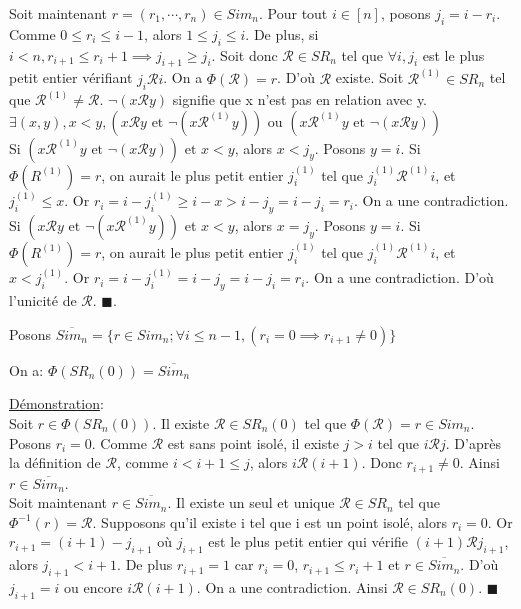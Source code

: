 			Soit maintenant $r=(r_{1},\cdots, r_{n}) \in Sim_{n}$. Pour tout $i\in[n]$, posons $j_{i}=i-r_{i} $.\\
			Comme $0\leq r_{i}\leq i-1 $, alors $1\leq j_{i} \leq i$. De plus, si $i<n,r_{i+1}\leq r_{i}+1 \implies j_{i+1}\geq j_{i} $. Soit donc $\mathcal{R}\in SR_{n}$ tel que $\forall i, j_{i}$ est le plus petit entier vérifiant $j_{i}\mathcal{R}i$. On a $\Phi(\mathcal{R})=r $. D'où $\mathcal{R}$ existe. Soit $\mathcal{R}^{(1)}\in SR_{n}$ tel que $\mathcal{R}^{(1)}\neq \mathcal{R}$. $\neg(x\mathcal{R}y) $ signifie que x n'est pas en relation avec y.\\
			$\exists (x,y), x<y, (x\mathcal{R}y\text{ et } \neg(x\mathcal{R}^{(1)}y) )\text{ ou }
			(x\mathcal{R}^{(1)}y\text{ et } \neg(x\mathcal{R}y) ) $\\
			Si $(x\mathcal{R}^{(1)}y\text{ et } \neg(x\mathcal{R}y)) \text{ et } x<y$, alors $x<j_{y}$. Posons $y=i$. Si $\Phi(R^{(1)})=r $, on aurait le plus petit entier $j^{(1)}_{i}$ tel que $j^{(1)}_{i} \mathcal{R}^{(1)}  i$, et $j^{(1)}_{i}\leq x$. Or $ r_{i}=i- j^{(1)}_{i} \geq i-x > i-j_{y} = i-j_{i}=r_{i}$. On a une contradiction.\\
			Si $(x\mathcal{R}y\text{ et } \neg(x\mathcal{R}^{(1)}y) )$ et $x<y$, alors  $x=j_{y}$. Posons $y=i$. Si $\Phi(R^{(1)})=r $, on aurait le plus petit entier $j^{(1)}_{i}$ tel que $j^{(1)}_{i} \mathcal{R}^{(1)}  i$, et $x<j^{(1)}_{i}$. Or $ r_{i}=i-j^{(1)}_{i}=i-j_{y}=i-j_{i}=r_{i} $. On a une contradiction. D'où l'unicité de $\mathcal{R}$. $\blacksquare$.\newpage

			Posons $\overline{Sim_{n}} = \{ r\in Sim_{n}; \forall i\leq n-1,(r_{i}=0  \implies r_{i+1}\neq 0) \} $

		\begin{proposition}
			On a: $\Phi(SR_{n}(0))= \overline{Sim_{n}} $
		\end{proposition}
		\underline{Démonstration}:\\
			Soit $r \in \Phi(SR_{n}(0))$. Il existe $\mathcal{R} \in SR_{n}(0) $ tel que $\Phi(\mathcal{R})=r \in Sim_{n}$. Posons $r_{i}=0$. Comme $\mathcal{R}$ est sans point isolé, il existe $j>i$ tel que $i\mathcal{R}j$. D'après la définition de $\mathcal{R}$, comme $ i<i+1 \leq j $, alors $i\mathcal{R}(i+1)$. Donc $r_{i+1}\neq 0$. Ainsi $r\in \overline{Sim_{n}}$.\\
			Soit  maintenant $r\in \overline{Sim_{n}}$. Il existe un seul et unique $\mathcal{R}\in SR_{n}$ tel que $\Phi^{-1}(r)=\mathcal{R}$. Supposons qu'il existe i tel que i est un point isolé, alors $r_{i}=0$. Or $r_{i+1}=(i+1)-j_{i+1}$ où $j_{i+1}$ est le plus petit entier qui vérifie $(i+1) \mathcal{R} j_{i+1}$, alors $j_{i+1}<i+1$. De plus $r_{i+1}=1$ car $r_{i}=0$, $r_{i+1}\leq r_{i}+1$ et $r\in  \overline{Sim_{n}}$. D'où $j_{i+1}=i$ ou encore $i\mathcal{R}(i+1)$. On a une contradiction. Ainsi $\mathcal{R}\in SR_{n}(0)$. $\blacksquare$


